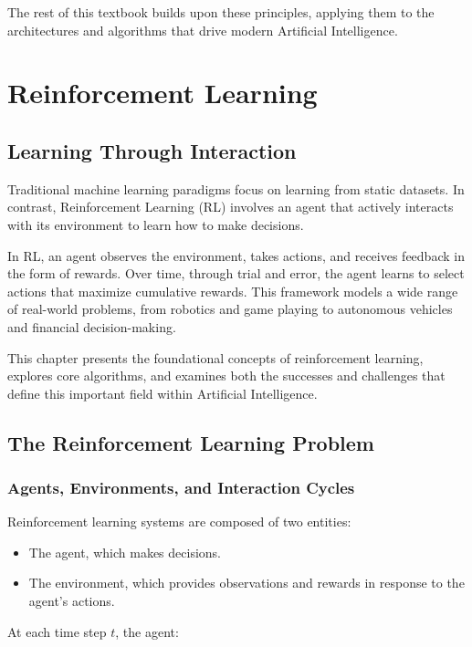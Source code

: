 \documentclass[openany]{book}
\begin{document}
The rest of this textbook builds upon these principles, applying them to the 
architectures and algorithms that drive modern Artificial Intelligence.

\chapter{Reinforcement Learning}

\section{Learning Through Interaction}

Traditional machine learning paradigms focus on learning from static datasets. 
In contrast, Reinforcement Learning (RL) involves an agent that actively 
interacts with its environment to learn how to make decisions.

In RL, an agent observes the environment, takes actions, and receives feedback 
in the form of rewards. Over time, through trial and error, the agent learns to 
select actions that maximize cumulative rewards. This framework models a wide 
range of real-world problems, from robotics and game playing to autonomous 
vehicles and financial decision-making.

This chapter presents the foundational concepts of reinforcement learning, 
explores core algorithms, and examines both the successes and challenges that 
define this important field within Artificial Intelligence.

\section{The Reinforcement Learning Problem}

\subsection{Agents, Environments, and Interaction Cycles}

Reinforcement learning systems are composed of two entities:

\begin{itemize}
    \item The agent, which makes decisions.
    \item The environment, which provides observations and rewards in response 
    to the agent's actions.
\end{itemize}

At each time step \( t \), the agent:
\end{document}
